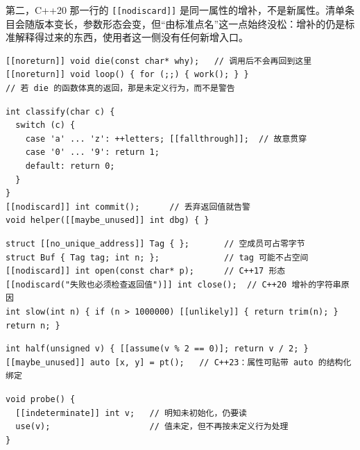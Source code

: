 \documentclass[12pt,a4paper,fontset=fandol]{ctexbook}
\newcommand{\cppxxlabel}[1]{%
  \tcbox[on line,colback=cpp20bg,colframe=cpp20bg,
    boxrule=0pt,arc=1pt,left=2pt,right=2pt,top=1pt,bottom=1pt,
    colupper=white,fontupper=\scriptsize\bfseries]{#1}}
\newcommand{\cpp}[1]{C++#1}
\begin{document}
第二，\cpp{20} 那一行的 \texttt{[[nodiscard]]} 是同一属性的增补，不是新属性。清单条目会随版本变长，参数形态会变，但“由标准点名”这一点始终没松：增补的仍是标准解释得过来的东西，使用者这一侧没有任何新增入口。

\cppxxlabel{C++11}
\begin{lstlisting}[style=cppstyle, caption={noreturn：最早的清单条目}, label={lst:ch2-cpp-std11}]
[[noreturn]] void die(const char* why);   // 调用后不会再回到这里
[[noreturn]] void loop() { for (;;) { work(); } }
// 若 die 的函数体真的返回，那是未定义行为，而不是警告
\end{lstlisting}

\cppxxlabel{C++17}
\begin{lstlisting}[style=cppstyle, caption={三个“改告警不改语义”的属性}, label={lst:ch2-cpp-std17}]
int classify(char c) {
  switch (c) {
    case 'a' ... 'z': ++letters; [[fallthrough]];  // 故意贯穿
    case '0' ... '9': return 1;
    default: return 0;
  }
}
[[nodiscard]] int commit();      // 丢弃返回值就告警
void helper([[maybe_unused]] int dbg) { }
\end{lstlisting}

\cppxxlabel{C++20}
\begin{lstlisting}[style=cppstyle, caption={带原因的 nodiscard、分支提示与布局属性}, label={lst:ch2-cpp-std20}]
struct [[no_unique_address]] Tag { };       // 空成员可占零字节
struct Buf { Tag tag; int n; };             // tag 可能不占空间
[[nodiscard]] int open(const char* p);      // C++17 形态
[[nodiscard("失败也必须检查返回值")]] int close();  // C++20 增补的字符串原因
int slow(int n) { if (n > 1000000) [[unlikely]] { return trim(n); } return n; }
\end{lstlisting}

\cppxxlabel{C++23}
\begin{lstlisting}[style=cppstyle, caption={assume 与结构化绑定上的属性}, label={lst:ch2-cpp-std23}]
int half(unsigned v) { [[assume(v % 2 == 0)]; return v / 2; }
[[maybe_unused]] auto [x, y] = pt();   // C++23：属性可贴带 auto 的结构化绑定
\end{lstlisting}

\cppxxlabel{C++26}
\begin{lstlisting}[style=cppstyle, caption={indeterminate：把“读取即 UB”收窄成“值未定”}, label={lst:ch2-cpp-std26}]
void probe() {
  [[indeterminate]] int v;   // 明知未初始化，仍要读
  use(v);                    // 值未定，但不再按未定义行为处理
}
\end{lstlisting}
\end{document}
